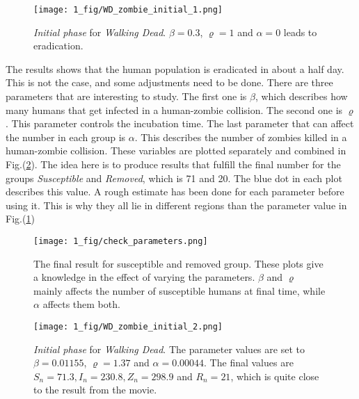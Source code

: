 \documentclass[%
twoside,                 %
final,                   %
chapterprefix=true,      %
open=right               %
10pt]{book}
\begin{document}
\begin{figure}[ht]
  \centerline{\texttt{[image: 1\_fig/WD\_zombie\_initial\_1.png]}}
  \caption{
  \label{fig:initial_phase_1} \emph{Initial phase} for \emph{Walking Dead}. $\beta=0.3$, $\varrho=1$ and $\alpha=0$ leads to eradication.
  }
\end{figure}


The results shows that the human population is eradicated in about a half day. This is not the case, and some adjustments need to be done. There are three parameters that are interesting to study. The first one is $\beta$, which describes how many humans that get infected in a human-zombie collision. The second one is $\varrho$. This parameter controls the incubation time. The last parameter that can affect the number in each group is $\alpha$. This describes the number of zombies killed in a human-zombie collision. These variables are plotted separately and combined in Fig.(\ref{fig:initial_parameters}). The idea here is to produce results that fulfill the final number for the groups \emph{Susceptible} and \emph{Removed}, which is 71 and 20. The blue dot in each plot describes this value. A rough estimate has been done for each parameter before using it. This is why they all lie in different regions than the parameter value in Fig.(\ref{fig:initial_phase_1})


\vspace{3mm}




\vspace{3mm}




\begin{figure}[ht]
  \centerline{\texttt{[image: 1\_fig/check\_parameters.png]}}
  \caption{
  \label{fig:initial_parameters} The final result for susceptible and removed group. These plots give a knowledge in the effect of varying the parameters. $\beta$ and $\varrho$ mainly affects the number of susceptible humans at final time, while $\alpha$ affects them both.
  }
\end{figure}




\begin{figure}[ht]
  \centerline{\texttt{[image: 1\_fig/WD\_zombie\_initial\_2.png]}}
  \caption{
  \label{fig:initial_phase_2} \emph{Initial phase} for \emph{Walking Dead}. The parameter values are set to $\beta=0.01155$, $\varrho=1.37$ and $\alpha=0.00044$. The final values are $S_n=71.3,I_n=230.8,Z_n=298.9$ and $R_n=21$, which is quite close to the result from the movie.
  }
\end{figure}
\end{document}
